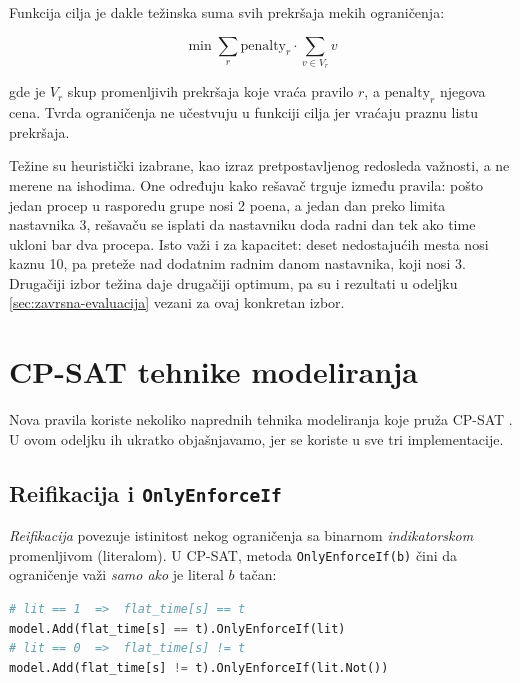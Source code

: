 \documentclass[12pt,oneside]{memoir}
\begin{document}
Funkcija cilja je dakle težinska suma svih prekršaja mekih ograničenja:

\begin{equation}
\min \sum_{r} \text{penalty}_r \cdot \sum_{v \in V_r} v
\label{eq:objective}
\end{equation}

gde je $V_r$ skup promenljivih prekršaja koje vraća pravilo $r$, a
$\text{penalty}_r$ njegova cena. Tvrda ograničenja ne učestvuju u
funkciji cilja jer vraćaju praznu listu prekršaja.

Težine su heuristički izabrane, kao izraz pretpostavljenog redosleda
važnosti, a ne merene na ishodima. One određuju kako rešavač trguje
između pravila: pošto jedan procep u rasporedu grupe nosi 2 poena, a
jedan dan preko limita nastavnika 3, rešavaču se isplati da nastavniku
doda radni dan tek ako time ukloni bar dva procepa. Isto važi i za
kapacitet: deset nedostajućih mesta nosi kaznu 10, pa preteže nad
dodatnim radnim danom nastavnika, koji nosi 3. Drugačiji izbor težina
daje drugačiji optimum, pa su i rezultati u odeljku
\ref{sec:zavrsna-evaluacija} vezani za ovaj konkretan izbor.

\section{CP-SAT tehnike modeliranja}
\label{sec:cpsat_tehnike}

Nova pravila koriste nekoliko naprednih tehnika modeliranja koje pruža
CP-SAT \cite{cpsat2020}. U ovom odeljku ih ukratko objašnjavamo, jer se
koriste u sve tri implementacije.

\subsection{Reifikacija i \texttt{OnlyEnforceIf}}

\emph{Reifikacija} povezuje istinitost nekog ograničenja sa binarnom
\emph{indikatorskom} promenljivom (literalom). U CP-SAT, metoda
\texttt{OnlyEnforceIf(b)} čini da ograničenje važi \emph{samo ako} je
literal $b$ tačan:

\begin{english}
\begin{lstlisting}[language=Python, caption={Uslovno (reifikovano) ograničenje}]
# lit == 1  =>  flat_time[s] == t
model.Add(flat_time[s] == t).OnlyEnforceIf(lit)
# lit == 0  =>  flat_time[s] != t
model.Add(flat_time[s] != t).OnlyEnforceIf(lit.Not())
\end{lstlisting}
\end{english}
\end{document}
